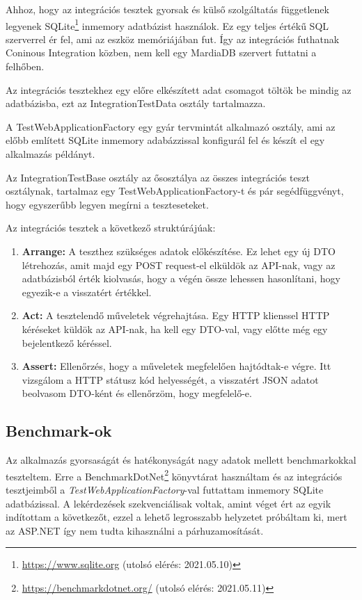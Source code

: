 Ahhoz, hogy az integrációs tesztek gyorsak és külső szolgáltatás függetlenek legyenek SQLite\footnote{\url{https://www.sqlite.org} (utolsó elérés: 2021.05.10)} inmemory adatbázist használok. Ez egy teljes értékű SQL szerverrel ér fel, ami az eszköz memóriájában fut. Így az integrációs futhatnak Coninous Integration közben, nem kell egy MardiaDB szervert futtatni a felhőben.

Az integrációs tesztekhez egy előre elkészített adat csomagot töltök be mindig az adatbázisba, ezt az IntegrationTestData osztály tartalmazza.

A TestWebApplicationFactory egy gyár tervmintát alkalmazó osztály, ami az előbb említett SQLite inmemory adabázzissal konfigurál fel és készít el egy alkalmazás példányt.

Az IntegrationTestBase osztály az ősosztálya az összes integrációs teszt osztálynak, tartalmaz egy TestWebApplicationFactory-t és pár segédfüggvényt, hogy egyszerűbb legyen megírni a teszteseteket.

Az integrációs tesztek a következő struktúrájúak:
\begin{enumerate}
	\item \textbf{Arrange:} A teszthez szükséges adatok előkészítése. Ez lehet egy új DTO létrehozás, amit majd egy POST request-el elküldök az API-nak, vagy az adatbázisból érték kiolvasás, hogy a végén össze lehessen hasonlítani, hogy egyezik-e a visszatért értékkel.
	\item \textbf{Act:} A tesztelendő műveletek végrehajtása. Egy HTTP klienssel HTTP kéréseket küldök az API-nak, ha kell egy DTO-val, vagy előtte még egy bejelentkező kéréssel.
	\item \textbf{Assert:} Ellenőrzés, hogy a műveletek megfelelően hajtódtak-e végre. Itt vizsgálom a HTTP státusz kód helyességét, a visszatért JSON adatot beolvasom DTO-ként és ellenőrzöm, hogy megfelelő-e.
\end{enumerate}

\clearpage

\subsection{Benchmark-ok}

Az alkalmazás gyorsaságát és hatékonyságát nagy adatok mellett benchmarkokkal teszteltem. Erre a BenchmarkDotNet\footnote{\url{https://benchmarkdotnet.org/} (utolsó elérés: 2021.05.11)} könyvtárat használtam és az integrációs tesztjeimből a \textit{TestWebApplicationFactory}-val futtattam inmemory SQLite adatbázissal. A lekérdezések szekvenciálisak voltak, amint véget ért az egyik indítottam a következőt, ezzel a lehető legrosszabb helyzetet próbáltam ki, mert az ASP.NET így nem tudta kihasználni a párhuzamosítását.

